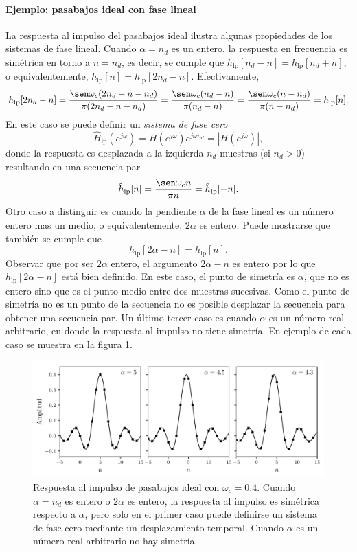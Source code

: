 \documentclass[a4paper]{report}
\begin{document}
\paragraph{Ejemplo: pasabajos ideal con fase lineal} La respuesta al impulso del pasabajos ideal ilustra algunas propiedades de los sistemas de fase lineal. Cuando \(\alpha=n_d\) es un entero, la respuesta en frecuencia es simétrica en torno a \(n=n_d\), es decir, se cumple que \(h_\textrm{lp}[n_d-n]=h_\textrm{lp}[n_d+n]\), o equivalentemente, \(h_\textrm{lp}[n]=h_\textrm{lp}[2n_d-n]\). Efectivamente,
\[
 h_\textrm{lp}[2n_d-n]=\frac{\sen\omega_c(2n_d-n-n_d)}{\pi(2n_d-n-n_d)}=\frac{\sen\omega_c(n_d-n)}{\pi(n_d-n)}
 =\frac{\sen\omega_c(n-n_d)}{\pi(n-n_d)}=h_\textrm{lp}[n].
\]
En este caso se puede definir un \emph{sistema de fase cero}
\[
 \hat{H}_\textrm{lp}(e^{j\omega})=H(e^{j\omega})e^{j\omega n_d}=|H(e^{j\omega})|,
\]
donde la respuesta es desplazada a la izquierda \(n_d\) muestras (si \(n_d>0\)) resultando en una secuencia par
\[
 \hat{h}_\textrm{lp}[n]=\frac{\sen\omega_c n}{\pi n}=\hat{h}_\textrm{lp}[-n].
\]
Otro caso a distinguir es cuando la pendiente \(\alpha\) de la fase lineal es un número entero mas un medio, o equivalentemente, \(2\alpha\) es entero. Puede mostrarse que también se cumple que 
\[
 h_\textrm{lp}[2\alpha-n]=h_\textrm{lp}[n].
\]
Observar que por ser \(2\alpha\) entero, el argumento \(2\alpha-n\) es entero por lo que \(h_\textrm{lp}[2\alpha-n]\) está bien definido. En este caso, el punto de simetría es \(\alpha\), que no es entero sino que es el punto medio entre dos muestras sucesivas. Como el punto de simetría no es un punto de la secuencia no es posible desplazar la secuencia para obtener una secuencia par. 
Un último tercer caso es cuando \(\alpha\) es un número real arbitrario, en donde la respuesta al impulso no tiene simetría. En ejemplo de cada caso se muestra en la figura \ref{fig:transform_analysis_example_05_14_linear_phase}.
\begin{figure}[!htb]
 \begin{center}
 \includegraphics[width=1\textwidth]{figuras/transform_analysis_example_05_14_linear_phase.pdf}
 \caption{\label{fig:transform_analysis_example_05_14_linear_phase} Respuesta al impulso de pasabajos ideal con \(\omega_c=0.4\). Cuando \(\alpha=n_d\) es entero o \(2\alpha\) es entero, la respuesta al impulso es simétrica respecto a \(\alpha\), pero solo en el primer caso puede definirse un sistema de fase cero mediante un desplazamiento temporal. Cuando \(\alpha\) es un número real arbitrario no hay simetría.}
 \end{center}
\end{figure}
\end{document}
